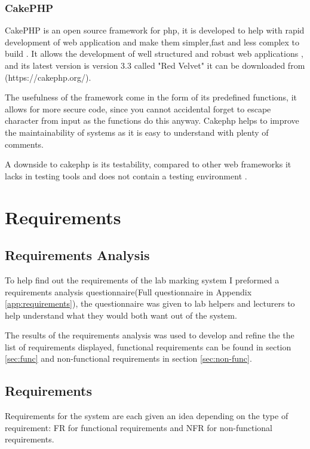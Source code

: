 \documentclass[12pt]{article}  %
\begin{document}
\subsubsection{CakePHP}
CakePHP is an open source framework for php, it is developed to help with rapid development of web application and make them simpler,fast and less complex to build \cite{noauthor_cakephp_nodate}. It allows the development of well structured and robust web applications \cite{plekhanova_evaluating_2009}, and its latest version is version 3.3 called "Red Velvet" it can be downloaded from (https://cakephp.org/).

The usefulness of the framework come in the form of its predefined functions, it allows for more secure code, since you cannot accidental forget to escape character from input as the functions do this anyway. Cakephp helps to improve the maintainability of systems as it is easy to understand with plenty of comments.

A downside to cakephp is its testability, compared to other web frameworks it lacks in testing tools and does not contain a testing environment \cite{plekhanova_evaluating_2009}.


\newpage
\section{Requirements}
\label{section:require}
 


\subsection{Requirements Analysis}
To help find out the requirements of the lab marking system I preformed a requirements analysis questionnaire(Full questionnaire in Appendix \ref{app:requirements}), the questionnaire was given to lab helpers and lecturers to help understand what they would both want out of the system. 

The results of the requirements analysis was used to develop and refine the the list of requirements displayed, functional requirements can be found in section \ref{sec:func} and non-functional requirements in section \ref{sec:non-func}.



\subsection{Requirements}
\label{sec:requirements}
Requirements for the system are each given an idea depending on the type of requirement: FR for functional requirements and NFR for non-functional requirements.
\end{document}
